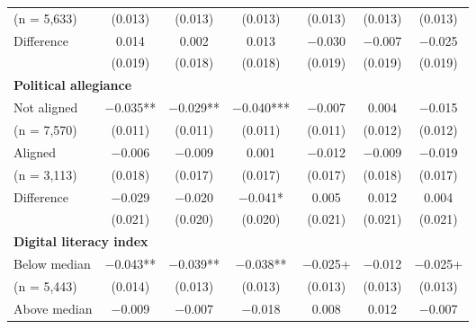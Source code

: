 \documentclass[letterpaper, 12pt, parskip=full,DIV=10]{scrartcl}
\begin{document}
\begin{table}[H]
{\begin{tabular}{lcccccc}
\hspace{1.5em}  (n = 5,633)& (\num{0.013}) & (\num{0.013}) & (\num{0.013}) & (\num{0.013}) & (\num{0.013}) & (\num{0.013})\\
 \cmidrule(lr){2-7}
 \hspace{1em} Difference & \num{0.014} & \num{0.002} & \num{0.013} & \num{-0.030} & \num{-0.007} & \num{-0.025}\\
\hspace{1.5em} & (\num{0.019}) & (\num{0.018}) & (\num{0.018}) & (\num{0.019}) & (\num{0.019}) & (\num{0.019})\\
  \multicolumn{4}{l}{\textbf{Political allegiance}} \rule{0pt}{1.2\normalbaselineskip}\\
\hspace{1em} Not aligned  & \num{-0.035}** & \num{-0.029}** & \num{-0.040}*** & \num{-0.007} & \num{0.004} & \num{-0.015}\\
\hspace{1.5em} (n = 7,570) & (\num{0.011}) & (\num{0.011}) & (\num{0.011}) & (\num{0.011}) & (\num{0.012}) & (\num{0.012})\\
\hspace{1em} Aligned  & \num{-0.006} & \num{-0.009} & \num{0.001} & \num{-0.012} & \num{-0.009} & \num{-0.019}\\
\hspace{1.5em} (n = 3,113)& (\num{0.018}) & (\num{0.017}) & (\num{0.017}) & (\num{0.017}) & (\num{0.018}) & (\num{0.017})\\
  \cmidrule(lr){2-7}
 \hspace{1em} Difference & \num{-0.029} & \num{-0.020} & \num{-0.041}* & \num{0.005} & \num{0.012} & \num{0.004}\\
\hspace{1.5em} & (\num{0.021}) & (\num{0.020}) & (\num{0.020}) & (\num{0.021}) & (\num{0.021}) & (\num{0.021})\\
 \multicolumn{4}{l}{\textbf{Digital literacy index }}  \rule{0pt}{1.2\normalbaselineskip}\\
\hspace{1em} Below median & \num{-0.043}** & \num{-0.039}** & \num{-0.038}** & \num{-0.025}+ & \num{-0.012} & \num{-0.025}+\\
\hspace{1.5em}  (n = 5,443)& (\num{0.014}) & (\num{0.013}) & (\num{0.013}) & (\num{0.013}) & (\num{0.013}) & (\num{0.013})\\
\hspace{1em} Above median & \num{-0.009} & \num{-0.007} & \num{-0.018} & \num{0.008} & \num{0.012} & \num{-0.007}\\

\end{tabular}}
\end{table}
\end{document}
